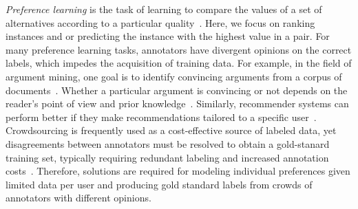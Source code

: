 %
\emph{Preference learning} is the task of learning to compare the values of a set of alternatives
according to a particular quality~\citep{furnkranz2010preference}. Here, we focus on ranking 
instances and or predicting the instance with the highest value in a pair.
For many preference learning tasks, annotators have divergent opinions on the correct labels,
which impedes the acquisition of training data.
For example, in the field of argument mining, one goal is to 
identify convincing arguments from a corpus of documents~\citep{habernal2016argument}. 
Whether a particular argument is convincing or not depends on the reader's point of view and prior knowledge~\citep{lukin2017argument}.
Similarly, recommender systems can perform better if they make recommendations tailored
to a specific user~\citep{resnick1997recommender}.
Crowdsourcing is frequently used as a cost-effective source of labeled data, 
yet disagreements between annotators must be resolved to obtain a gold-stanard
training set, typically requiring redundant labeling and increased annotation costs~\citep{snow2008cheap,banerji2010galaxy,gaunt2016training}.
Therefore, solutions are required for modeling individual preferences given
limited data per user and producing gold standard labels from crowds of annotators with different opinions.

